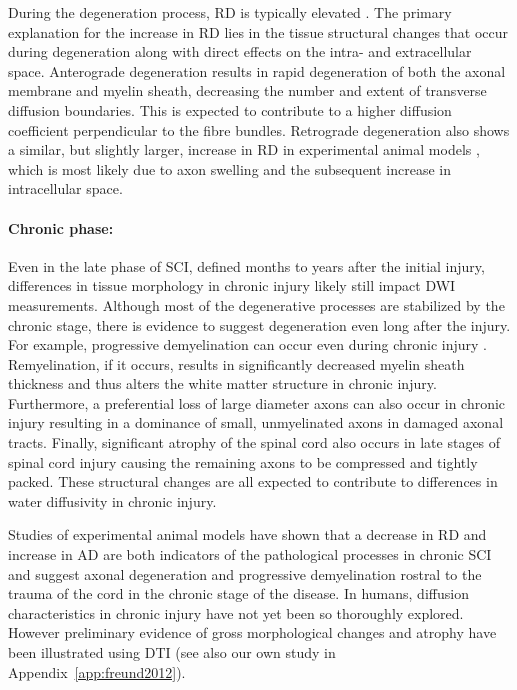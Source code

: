 During the degeneration process, \gls{RD} is typically elevated \citep{Deo:2006}. The primary explanation for the increase in \gls{RD} lies in the tissue structural changes that occur during degeneration along with direct effects on the intra- and extracellular space.  Anterograde degeneration results in rapid degeneration of both the axonal membrane and myelin sheath, decreasing the number and extent of transverse diffusion boundaries.  This is expected to contribute to a higher diffusion coefficient perpendicular to the fibre bundles.  Retrograde degeneration also shows a similar, but slightly larger, increase in \gls{RD} in experimental animal models \citep{Deo:2006}, which is most likely due to axon swelling and the subsequent increase in intracellular space\citep{Balentine:1978}. 
%
%
\paragraph{Chronic phase: } Even in the late phase of \gls{SCI}, defined months to years after the initial injury, differences in tissue morphology in chronic injury likely still impact \gls{DWI} measurements. Although most of the degenerative processes are stabilized by the chronic stage, there is evidence to suggest degeneration even long after the injury.  For example, progressive demyelination can occur even during chronic injury \citep{Blight:1986,Bunge:1993}.  Remyelination, if it occurs, results in significantly decreased myelin sheath thickness \citep{Blight:1986,Bunge:1993,Harrison:2004,Totoiu:2005} and thus alters the white matter structure in chronic injury.  Furthermore, a preferential loss of large diameter axons can also occur in chronic injury\citep{Blight:1986} resulting in a dominance of small, unmyelinated axons in damaged axonal tracts.  Finally, significant atrophy of the spinal cord also occurs in late stages of spinal cord injury\citep{Ellingson:2008a,Lundell:2010,Freund:2011} causing the remaining axons to be compressed and tightly packed. These structural changes are all expected to contribute to differences in water diffusivity in chronic injury.



Studies of experimental animal models have shown that a decrease in \gls{RD} and increase in \gls{AD} are both indicators of the pathological processes in chronic \gls{SCI} \citep{Song:2002,Kim:2006,Budde:2008,Feng:2009,Kim:2009,Zhang:2009} and suggest axonal degeneration and progressive demyelination rostral to the trauma of the cord in the chronic stage of the disease. In humans, diffusion characteristics in chronic injury have not yet been so thoroughly explored. However preliminary evidence of gross morphological changes and atrophy have been illustrated using \gls{DTI} \citep{Ellingson:2008,Cohen-Adad:2011} (see also our own study in Appendix~\ref{app:freund2012}). 

